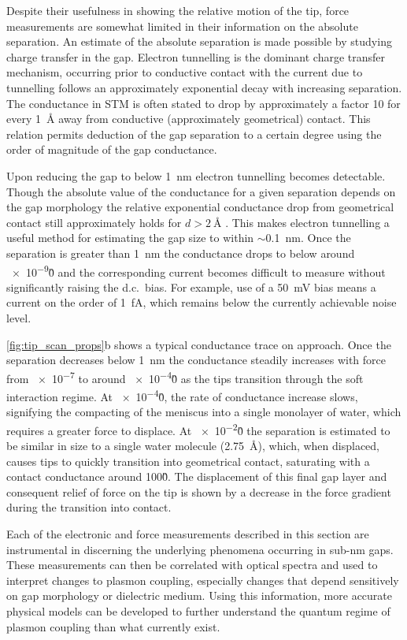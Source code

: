 \documentclass[a4paper]{article}
\begin{document}
Despite their usefulness in showing the relative motion of the tip, force measurements are somewhat limited in their information on the absolute separation. An estimate of the absolute separation is made possible by studying charge transfer in the gap. Electron tunnelling is the dominant charge transfer mechanism, occurring prior to conductive contact with the current due to tunnelling follows an approximately exponential decay with increasing separation. The conductance in STM is often stated to drop by approximately a factor 10 for every \SI{1}{\angstrom} away from conductive (approximately geometrical) contact. This relation permits deduction of the gap separation to a certain degree using the order of magnitude of the gap conductance.

Upon reducing the gap to below \SI{1}{nm} electron tunnelling becomes detectable. Though the absolute value of the conductance for a given separation depends on the gap morphology the relative exponential conductance drop from geometrical contact still approximately holds for $d>\SI{2}{\angstrom}$ \cite{esteban2015}. This makes electron tunnelling a useful method for estimating the gap size to within $\sim$\SI{0.1}{nm}. Once the separation is greater than \SI{1}{nm} the conductance drops to below around \num{e-9}\G0 and the corresponding current becomes difficult to measure without significantly raising the d.c.\ bias. For example, use of a \SI{50}{mV} bias means a current on the order of \SI{1}{fA}, which remains below the currently achievable noise level.

\autoref{fig:tip_scan_props}b shows a typical conductance trace on approach. Once the separation decreases below \SI{1}{nm} the conductance steadily increases with force from \num{e-7} to around \num{e-4}\G0 as the tips transition through the soft interaction regime. At \num{e-4}\G0, the rate of conductance increase slows, signifying the compacting of the meniscus into a single monolayer of water, which requires a greater force to displace. At \num{e-2}\G0 the separation is estimated to be similar in size to a single water molecule (\SI{2.75}{\angstrom}), which, when displaced, causes tips to quickly transition into geometrical contact, saturating with a contact conductance around 100\G0. The displacement of this final gap layer and consequent relief of force on the tip is shown by a decrease in the force gradient during the transition into contact.

Each of the electronic and force measurements described in this section are instrumental in discerning the underlying phenomena occurring in sub-nm gaps. These measurements can then be correlated with optical spectra and used to interpret changes to plasmon coupling, especially changes that depend sensitively on gap morphology or dielectric medium. Using this information, more accurate physical models can be developed to further understand the quantum regime of plasmon coupling than what currently exist.
\end{document}
